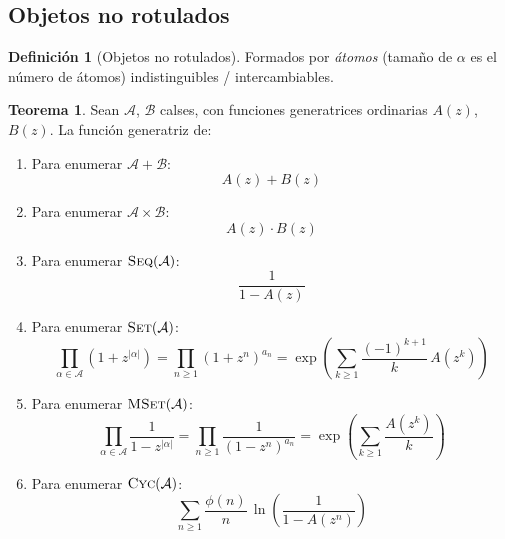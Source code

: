 \documentclass[english, spanish, fleqn, 10pt]{article}
\numberwithin{equation}{section}
\newcommand{\nparentesis}[1]{\left( #1 \right)}
\theoremstyle{definition}
\newtheorem{teorema}{Teorema}[section]
\newtheorem{definition}{Definición}[section]
\DeclareMathOperator{\Seq}{\textsc{Seq}}
\DeclareMathOperator{\Cyc}{\textsc{Cyc}}
\DeclareMathOperator{\Set}{\textsc{Set}}
\DeclareMathOperator{\MSet}{\textsc{MSet}}
\begin{document}
\subsection{Objetos no rotulados}

\begin{definition}[Objetos no rotulados]
	Formados por \emph{átomos} (tamaño de $\alpha$ es el número de átomos) indistinguibles / intercambiables.
\end{definition}

\begin{teorema}\label{19::Propiedades:No:Rotulados}
	Sean $\mathcal{A}$, $\mathcal{B}$ calses, con funciones generatrices ordinarias $A\nparentesis{z}$, $B\nparentesis{z}$. La función generatriz de:
	\begin{enumerate}
		\item
		Para enumerar \(\mathcal{A} + \mathcal{B}\):
		\begin{equation*}
		A(z) + B(z)
		\end{equation*}
		\item
		Para enumerar \(\mathcal{A} \times \mathcal{B}\):
		\begin{equation*}
		A(z) \cdot B(z)
		\end{equation*}
		\item
		Para enumerar \(\Seq(\mathcal{A})\):
		\begin{equation*}
		\frac{1}{1 - A(z)}
		\end{equation*}
		\item
		Para enumerar \(\Set(\mathcal{A})\):
		\begin{equation*}
		\prod_{\alpha \in \mathcal{A}}
		\left( 1 + z^{\lvert \alpha \rvert} \right)
		= \prod_{n \ge 1} (1 + z^n)^{a_n}
		= \exp \left(
		\sum_{k \ge 1} \frac{(-1)^{k + 1}}{k} \, A(z^k)
		\right)
		\end{equation*}
		\item
		Para enumerar \(\MSet(\mathcal{A})\):
		\begin{equation*}
		\prod_{\alpha \in \mathcal{A}}
		\frac{1}{1 - z^{\lvert \alpha \rvert}}
		= \prod_{n \ge 1} \frac{1}{(1 - z^n)^{a_n}}
		= \exp\left(
		\sum_{k \ge 1} \frac{A(z^k)}{k}
		\right)
		\end{equation*}
		\item
		Para enumerar \(\Cyc(\mathcal{A})\):
		\begin{equation*}
		\sum_{n \ge 1} \frac{\phi(n)}{n} \, \ln \nparentesis{\frac{1}{1 - A(z^n)}}
		\end{equation*}
	\end{enumerate}
\end{teorema}
\end{document}
